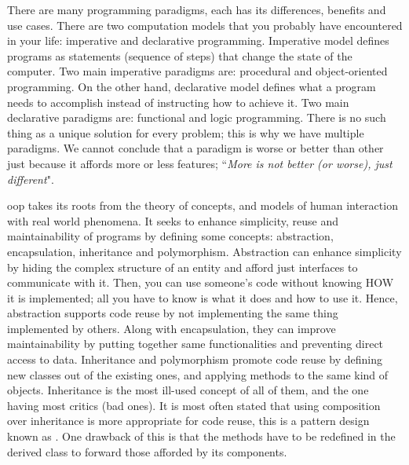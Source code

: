 \documentclass[12pt]{book}
\begin{document}
\begin{discussion}

There are many programming paradigms, each has its differences, benefits and use cases. 
There are two computation models that you probably have encountered in your life: imperative and declarative programming. 
Imperative model defines programs as statements (sequence of steps) that change the state of the computer. 
Two main imperative paradigms are: procedural and object-oriented programming. 
On the other hand, declarative model defines what a program needs to accomplish instead of instructing how to achieve it. 
Two main declarative paradigms are: functional and logic programming.
There is no such thing as a unique solution for every problem; this is why we have multiple paradigms. 
We cannot conclude that a paradigm is worse or better than other just because it affords more or less features; ``\textit{More is not better (or worse), just different}"\citep{2004-vanroy-haridi}.

\ac{oop} takes its roots from the theory of concepts, and models of human interaction with real world phenomena. 
It seeks to enhance simplicity, reuse and maintainability of programs by defining some concepts: abstraction, encapsulation, inheritance and polymorphism.
Abstraction can enhance simplicity by hiding the complex structure of an entity and afford just interfaces to communicate with it. 
Then, you can use someone's code without knowing HOW it is implemented; all you have to know is what it does and how to use it. 
Hence, abstraction supports code reuse by not implementing the same thing implemented by others. 
Along with encapsulation, they can improve maintainability by putting together same functionalities and preventing direct access to data. 
Inheritance and polymorphism promote code reuse by defining new classes out of the existing ones, and applying methods to the same kind of objects. 
Inheritance is the most ill-used concept of all of them, and the one having most critics (bad ones). 
It is most often stated that using composition over inheritance is more appropriate for code reuse, this is a pattern design known as  \citep{2002-knoernschild}.
One drawback of this is that the methods have to be redefined in the derived class to forward those afforded by its components.

\end{discussion}


\ifx\wholebook\relax\else
% 
% 
	
\end{document}
